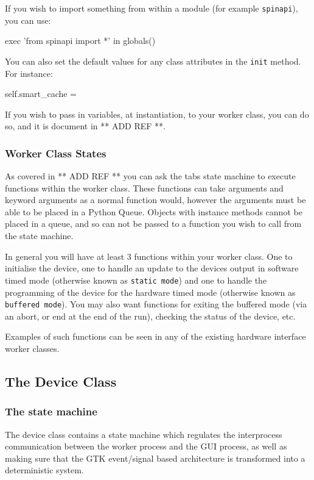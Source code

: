 \documentclass[12pt]{article}
\begin{document}
If you wish to import something from within a module (for example \texttt{spinapi}), you can use:
\begin{python}
        exec 'from spinapi import *' in globals()
\end{python}

You can also set the default values for any class attributes in the \texttt{init} method. For instance:
\begin{python}
        self.smart_cache = {}
\end{python}

If you wish to pass in variables, at instantiation, to your worker class, you can do so, and it is document in ** ADD REF **.

\subsubsection{Worker Class States}
As covered in ** ADD REF ** you can ask the tabs state machine to execute functions within the worker class. These functions can take arguments and keyword arguments as a normal function would, however the arguments must be able to be placed in a Python Queue. Objects with instance methods cannot be placed in a queue, and so can not be passed to a function you wish to call from the state machine.

In general you will have at least 3 functions within your worker class. One to initialise the device, one to handle an update to the devices output in software timed mode (otherwise known as \texttt{static mode}) and one to handle the programming of the device for the hardware timed mode (otherwise known as \texttt{buffered mode}). You may also want functions for exiting the buffered mode (via an abort, or end at the end of the run), checking the status of the device, etc.

Examples of such functions can be seen in any of the existing hardware interface worker classes.

\subsection{The Device Class}\label{device_class}

\subsubsection{The state machine}\label{device_class_state_machine}
The device class contains a state machine which regulates the interprocess communication between the worker process and the GUI process, as well as making sure that the GTK event/signal based architecture is transformed into a deterministic system. 
\end{document}
